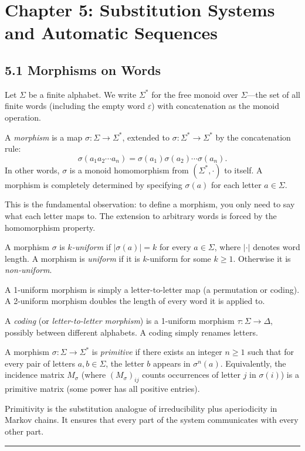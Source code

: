 \chapter{Chapter 5: Substitution Systems and Automatic Sequences}

\section{5.1 Morphisms on Words}

Let $\Sigma$ be a finite alphabet. We write $\Sigma^*$ for the free monoid over $\Sigma$---the set of all finite words (including the empty word $\varepsilon$) with concatenation as the monoid operation.

\begin{definition}[Morphism]
A \textit{morphism} is a map $\sigma: \Sigma \to \Sigma^*$, extended to $\sigma: \Sigma^* \to \Sigma^*$ by the concatenation rule:
\[
\sigma(a_1 a_2 \cdots a_n) = \sigma(a_1)\sigma(a_2)\cdots\sigma(a_n).
\]
In other words, $\sigma$ is a monoid homomorphism from $(\Sigma^*, \cdot)$ to itself. A morphism is completely determined by specifying $\sigma(a)$ for each letter $a \in \Sigma$.

This is the fundamental observation: to define a morphism, you only need to say what each letter maps to. The extension to arbitrary words is forced by the homomorphism property.
\end{definition}

\begin{definition}
A morphism $\sigma$ is \textit{$k$-uniform} if $|\sigma(a)| = k$ for every $a \in \Sigma$, where $|\cdot|$ denotes word length. A morphism is \textit{uniform} if it is $k$-uniform for some $k \geq 1$. Otherwise it is \textit{non-uniform}.

A 1-uniform morphism is simply a letter-to-letter map (a permutation or coding). A 2-uniform morphism doubles the length of every word it is applied to.
\end{definition}

\begin{definition}[Coding]
A \textit{coding} (or \textit{letter-to-letter morphism}) is a 1-uniform morphism $\tau: \Sigma \to \Delta$, possibly between different alphabets. A coding simply renames letters.
\end{definition}

\begin{definition}
A morphism $\sigma: \Sigma \to \Sigma^*$ is \textit{primitive} if there exists an integer $n \geq 1$ such that for every pair of letters $a, b \in \Sigma$, the letter $b$ appears in $\sigma^n(a)$. Equivalently, the incidence matrix $M_\sigma$ (where $(M_\sigma)_{ij}$ counts occurrences of letter $j$ in $\sigma(i)$) is a primitive matrix (some power has all positive entries).

Primitivity is the substitution analogue of irreducibility plus aperiodicity in Markov chains. It ensures that every part of the system communicates with every other part.

\bigskip\hrule\bigskip
\end{definition}

